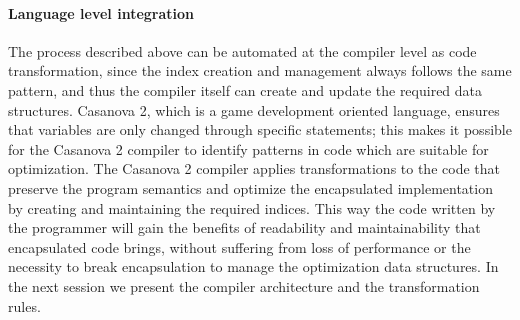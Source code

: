 \paragraph*{Language level integration}

The process described above can be automated at the compiler level as code transformation, since the index creation and management always follows the same pattern, and thus the compiler itself can create and update the required data structures. Casanova 2, which is a game development oriented language, ensures that variables are only changed through specific statements; this makes it possible for the Casanova 2 compiler to identify patterns in code which are suitable for optimization. The Casanova 2 compiler applies transformations to the code that preserve the program semantics and optimize the encapsulated implementation by creating and maintaining the required indices. This way the code written by the programmer will gain the benefits of readability and maintainability that encapsulated code brings, without suffering from loss of performance or the necessity to break encapsulation to manage the optimization data structures. In the next session we present the compiler architecture and the transformation rules. 